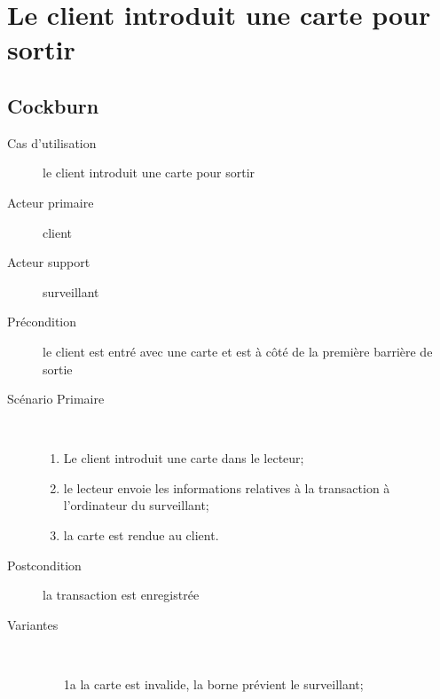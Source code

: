 \documentclass[a4paper]{article}
\begin{document}
\newpage

\section{Le client introduit une carte pour sortir}
\subsection{Cockburn}
\begin{description}
	\item[Cas d'utilisation] le client introduit une carte pour sortir
	\item[Acteur primaire] client
	\item[Acteur support] surveillant
	\item[Pr\'econdition] le client est entr\'e avec une carte et est \`a
		c\^ot\'e de la premi\`ere barri\`ere de sortie
	\item[Sc\'enario Primaire] \
	\begin{enumerate}
		\item Le client introduit une carte dans le lecteur;
		\item le lecteur envoie les informations relatives \`a la transaction
			\`a l'ordinateur du surveillant;
		\item la carte est rendue au client.
	\end{enumerate}
	\item[Postcondition] la transaction est enregistr\'ee
	\item[Variantes] \
	\begin{enumerate}
		\item[1a] la carte est invalide, la borne pr\'evient le surveillant;
	\end{enumerate}
\end{description}
\end{document}
